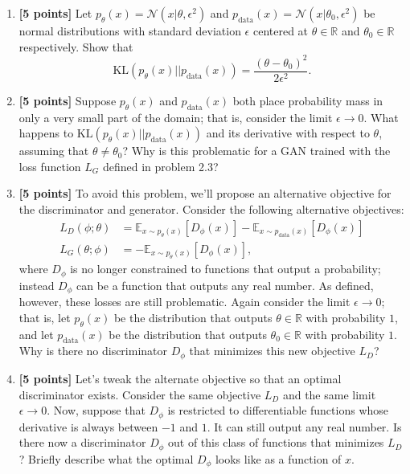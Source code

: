 \documentclass{article}
\begin{document}
\begin{enumerate}
    \item \textbf{[5 points]} Let $p_\theta(x) = \mathcal{N}(x|\theta, \epsilon^2)$ and $p_\text{data}(x) = \mathcal{N}(x|\theta_0, \epsilon^2)$ be normal distributions with standard deviation $\epsilon$ centered at $\theta \in \mathbb{R}$ and $\theta_0 \in \mathbb{R}$ respectively. Show that \[
        \mathrm{KL}(p_\theta(x) || p_\text{data}(x)) = \frac{(\theta - \theta_0)^2}{2\epsilon^2}.
    \]
    
    \item \textbf{[5 points]} Suppose $p_\theta(x)$ and $p_\text{data}(x)$ both place probability mass in only a very small part of the domain; that is, consider the limit $\epsilon \to 0$. What happens to $\mathrm{KL}(p_\theta(x) || p_\text{data}(x))$ and its derivative with respect to $\theta$, assuming that $\theta \ne \theta_0$? Why is this problematic for a GAN trained with the loss function $L_G$ defined in problem 2.3?
    
    \item \textbf{[5 points]} To avoid this problem, we'll propose an alternative objective for the discriminator and generator. Consider the following alternative objectives: \begin{align*}
         L_D(\phi; \theta) &= \mathbb{E}_{x \sim p_\theta(x)}[D_\phi(x)] - \mathbb{E}_{x \sim p_\text{data}(x)}[D_\phi(x)] \\
        L_G(\theta; \phi) &= -\mathbb{E}_{x \sim p_\theta(x)}[D_\phi(x)],
    \end{align*} where $D_\phi$ is no longer constrained to functions that output a probability; instead $D_\phi$ can be a function that outputs any real number. As defined, however, these losses are still problematic. Again consider the limit $\epsilon \to 0$; that is, let $p_\theta(x)$ be the distribution that outputs $\theta \in \mathbb{R}$ with probability $1$, and let $p_\text{data}(x)$ be the distribution that outputs $\theta_0 \in \mathbb{R}$ with probability $1$. Why is there no discriminator $D_\phi$ that minimizes this new objective $L_D$?
    
    \item \textbf{[5 points]} Let's tweak the alternate objective so that an optimal discriminator exists. Consider the same objective $L_D$ and the same limit $\epsilon \to 0$. Now, suppose that $D_\phi$ is restricted to differentiable functions whose derivative is always between $-1$ and $1$. It can still output any real number. Is there now a discriminator $D_\phi$ out of this class of functions that minimizes $L_D$? Briefly describe what the optimal $D_\phi$ looks like as a function of $x$.
    

\end{enumerate}
\end{document}
